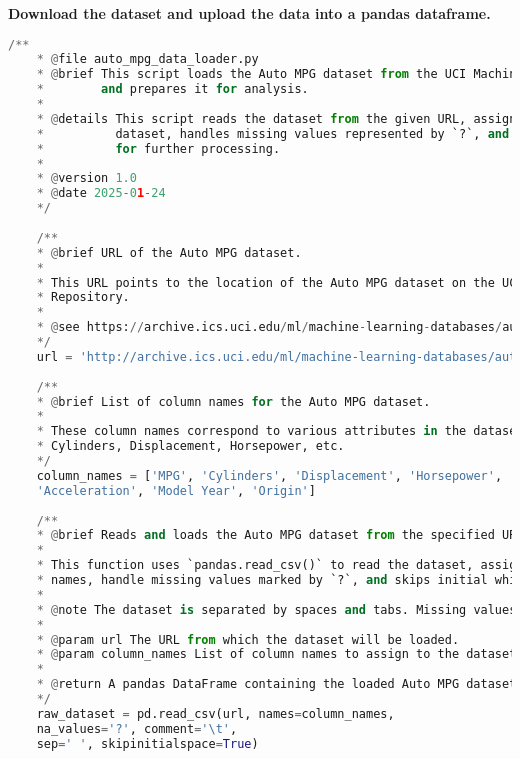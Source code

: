 	\pagebreak
	\textbf{Download the dataset and upload the data into a pandas dataframe.}
\begin{lstlisting}[language=Python]
	/**
	* @file auto_mpg_data_loader.py
	* @brief This script loads the Auto MPG dataset from the UCI Machine Learning Repository
	*        and prepares it for analysis.
	* 
	* @details This script reads the dataset from the given URL, assigns column names to the
	*          dataset, handles missing values represented by `?`, and prepares the dataset
	*          for further processing.
	* 
	* @version 1.0
	* @date 2025-01-24
	*/
	
	/**
	* @brief URL of the Auto MPG dataset.
	* 
	* This URL points to the location of the Auto MPG dataset on the UCI Machine Learning
	* Repository.
	* 
	* @see https://archive.ics.uci.edu/ml/machine-learning-databases/auto-mpg/
	*/
	url = 'http://archive.ics.uci.edu/ml/machine-learning-databases/auto-mpg/auto-mpg.data'
	
	/**
	* @brief List of column names for the Auto MPG dataset.
	* 
	* These column names correspond to various attributes in the dataset such as MPG,
	* Cylinders, Displacement, Horsepower, etc.
	*/
	column_names = ['MPG', 'Cylinders', 'Displacement', 'Horsepower', 'Weight',
	'Acceleration', 'Model Year', 'Origin']
	
	/**
	* @brief Reads and loads the Auto MPG dataset from the specified URL.
	* 
	* This function uses `pandas.read_csv()` to read the dataset, assign appropriate column
	* names, handle missing values marked by `?`, and skips initial whitespace.
	* 
	* @note The dataset is separated by spaces and tabs. Missing values are represented as `?`.
	* 
	* @param url The URL from which the dataset will be loaded.
	* @param column_names List of column names to assign to the dataset.
	* 
	* @return A pandas DataFrame containing the loaded Auto MPG dataset.
	*/
	raw_dataset = pd.read_csv(url, names=column_names,
	na_values='?', comment='\t',
	sep=' ', skipinitialspace=True)
\end{lstlisting}
	
